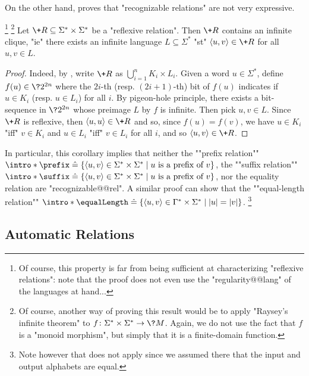 On the other hand,  proves that "recognizable relations" are not very expressive.
\begin{corollary}
	\!\footnote{Of course, this property is far from being sufficient
	at characterizing "reflexive relations": note that the proof
	does not even use the "regularity@@lang" of the languages at hand...}%
	\footnote{Of course, another way of proving this result would be
	to apply "Raysey's infinite theorem" to $f\colon \Sigma^* \times \Sigma^* \to \?M$.
	Again, we do not use the fact that $f$ is a "monoid morphism", but simply
	that it is a finite-domain function.}
	\AP\label{coro:infinite-clique-recognizable}
	Let $\+R \subseteq \Sigma^* \times \Sigma^*$ be a "reflexive relation".
	Then $\+R$ contains an infinite clique, "ie"
	there exists an infinite language $L \subseteq \Sigma^*$ "st"
	$\tup{u,v} \in \+R$ for all $u,v \in L$.
\end{corollary}
\begin{proof}
	Indeed, by , write $\+R$ as $\bigcup_{i=1}^n K_i \times L_i$.
	Given a word $u \in \Sigma^*$, define $f(u) \in \?2^{2n}$ where
	the $2i$-th (resp. $(2i+1)$-th) bit of $f(u)$ indicates if $u \in K_i$ (resp. $u \in L_i$)
	for all $i$.
	By pigeon-hole principle, there exists a bit-sequence in $\?2^{2n}$ whose preimage
	$L$ by $f$ is infinite. Then pick $u,v \in L$. Since $\+R$ is reflexive, then
	$\tup{u,u} \in \+R$ and so, since $f(u) = f(v)$, we
	have $u \in K_i$ "iff" $v \in K_i$ and
	$u \in L_i$ "iff" $v \in L_i$ for all $i$, and so $\tup{u,v} \in \+R$.
\end{proof}

In particular, this corollary implies that neither the \AP""prefix relation""
${\intro*\prefix} \defeq \{
	\tup{u,v} \in \Sigma^*\times\Sigma^* \mid
	\text{$u$ is a prefix of $v$}
\}$, the \AP""suffix relation""
${\intro*\suffix} \defeq \{
	\tup{u,v} \in \Sigma^*\times\Sigma^* \mid
	\text{$u$ is a prefix of $v$}
\}$, nor the equality relation are "recognizable@@rel".
A similar proof can show that the ""equal-length relation""
${\intro*\equalLength} \defeq \{
	\tup{u,v} \in \Gamma^*\times\Sigma^* \mid
	|u| = |v|
\}$.%
\footnote{Note however that  does not apply since
we assumed there that the input and output alphabets are equal.}


\subsection{Automatic Relations}

